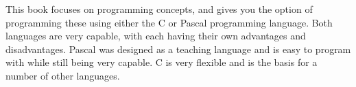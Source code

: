 This book focuses on programming concepts, and gives you the option of programming these using either the C or Pascal programming language. Both languages are very capable, with each having their own advantages and disadvantages. Pascal was designed as a teaching language and is easy to program with while still being very capable. C is very flexible and is the basis for a number of other languages.